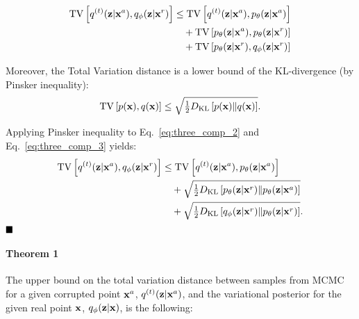 \begin{align}
\TV{q^{(t)}(\rvz|\rvx^a)}{q_{\phi}(\rvz|\rvx^r)}
&\leq 
    \TV{q^{(t)}(\rvz|\rvx^a)}{p_{\theta}(\rvz|\rvx^a)} \\
     &\quad+ 
    \TV{p_{\theta}(\rvz|\rvx^a)}{p_{\theta}(\rvz|\rvx^r)} \label{eq:three_comp_2}\\
    &\quad+
    \TV{p_{\theta}(\rvz|\rvx^r)}{q_{\phi}(\rvz|\rvx^r)} \label{eq:three_comp_3}
\end{align}

Moreover, the Total Variation distance is a lower bound of the KL-divergence (by Pinsker inequality):
\begin{equation}
    {\mathrm{TV}\left[p({\mathbf{x}}) ,q({\mathbf{x}}) \right]}
    \leq \sqrt{\tfrac12 D_{\mathrm{KL}}\left[p({\mathbf{x}})\|q({\mathbf{x}})\right]} .
\end{equation}

Applying Pinsker inequality to 
Eq.~\ref{eq:three_comp_2} and Eq.~\ref{eq:three_comp_3}
yields:
\begin{align}
{\mathrm{TV}\left[q^{(t)}({\mathbf{z}}|{\mathbf{x}}^a) ,q_{\phi}({\mathbf{z}}|{\mathbf{x}}^r) \right]}
&\leq 
    {\mathrm{TV}\left[q^{(t)}({\mathbf{z}}|{\mathbf{x}}^a) ,p_{\theta}({\mathbf{z}}|{\mathbf{x}}^a) \right]} \\
     &\quad+ 
    \sqrt{\tfrac12 D_{\mathrm{KL}}\left[p_{\theta}({\mathbf{z}}|{\mathbf{x}}^r)\|p_{\theta}({\mathbf{z}}|{\mathbf{x}}^a)\right]  } \\
    &\quad+
   \sqrt{\tfrac12  D_{\mathrm{KL}}\left[q_{\phi}({\mathbf{z}}|{\mathbf{x}}^r)\|p_{\theta}({\mathbf{z}}|{\mathbf{x}}^r)\right]} .
\end{align}
$\hfill\blacksquare$

\paragraph{Theorem 1}
The upper bound on the total variation distance between samples from MCMC for a given corrupted point ${\mathbf{x}}^a$, $q^{(t)}({\mathbf{z}}|{\mathbf{x}}^a)$, and the variational posterior for the given real point ${\mathbf{x}}$, $q_{\phi}({\mathbf{z}}|{\mathbf{x}})$, is the following:

